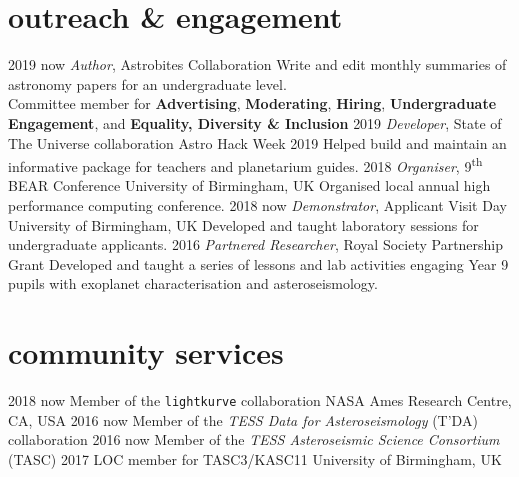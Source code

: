 \documentclass[]{k-cv} %
\begin{document}
\section{outreach \& engagement}
\begin{entrylist}
\centry
{2019 \to now}
{\emph{Author}, Astrobites Collaboration}
{}
{Write and edit monthly summaries of astronomy papers for an undergraduate level. \\ Committee member for \textbf{Advertising}, \textbf{Moderating}, \textbf{Hiring}, \textbf{Undergraduate Engagement}, and \textbf{Equality, Diversity \& Inclusion}}
\centry
{2019}
{\emph{Developer}, State of The Universe collaboration}
{Astro Hack Week 2019}
{Helped build and maintain an informative package for teachers and planetarium guides.}
\centry
{2018 }
{\emph{Organiser}, 9\textsuperscript{th} BEAR Conference}
{University of Birmingham, UK}
{Organised local annual high performance computing conference.}
\centry
{2018 \to now}
{\emph{Demonstrator}, Applicant Visit Day}
{University of Birmingham, UK}
{Developed and taught laboratory sessions for undergraduate applicants.}
\centry
{2016 }
{\emph{Partnered Researcher}, Royal Society Partnership Grant}
{}
{Developed and taught a series of lessons and lab activities engaging Year 9 pupils with exoplanet characterisation and asteroseismology.}
\end{entrylist}

\section{community services}
\begin{entrylist}
	\centrythree
	{2018 \to now}
	{Member of the \texttt{lightkurve} collaboration}
	{NASA Ames Research Centre, CA, USA}
	\centrythree
	{2016 \to now}
	{Member of the \emph{TESS Data for Asteroseismology} (T'DA) collaboration }
	{}
	\centrythree
	{2016 \to now}
	{Member of the \emph{TESS Asteroseismic Science Consortium} (TASC)}
	{}
	\centrythree
	{2017}
	{LOC member for TASC3/KASC11}
	{University of Birmingham, UK}
\end{entrylist}
\end{document}
